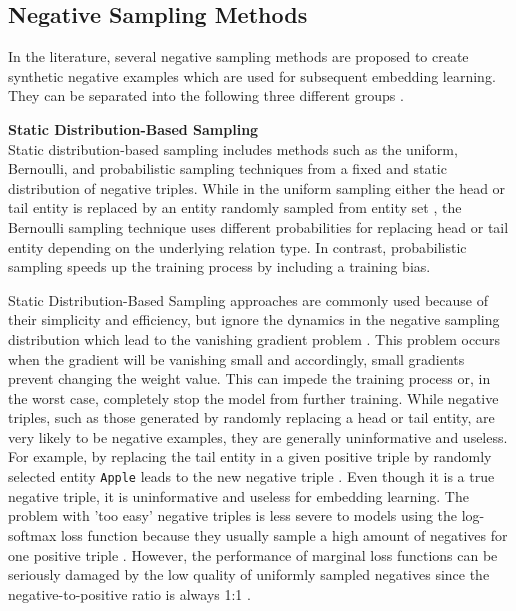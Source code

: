 \subsection{Negative Sampling Methods} 
\label{subsec:negative_sampling_methods}
%
In the literature, several negative sampling methods are proposed to create synthetic negative examples which are used for subsequent embedding learning.
They can be separated into the following three different groups \cite{qianunderstanding}.

\textbf{Static Distribution-Based Sampling} \label{static_distribution_based_sampling}\\
Static distribution-based sampling includes methods such as the uniform, Bernoulli, and probabilistic sampling techniques from a fixed and static distribution of negative triples.
While in the uniform sampling either the head or tail entity is replaced by an entity randomly sampled from entity set \entities,
the Bernoulli sampling technique uses different probabilities for replacing head or tail entity depending on the underlying relation type.
In contrast, probabilistic sampling speeds up the training process by including a training bias.
	
Static Distribution-Based Sampling approaches are commonly used because of their simplicity and efficiency, but ignore the dynamics in the negative sampling distribution which lead to the vanishing gradient problem \cite{qianunderstanding}.
This problem occurs when the gradient will be vanishing small and accordingly, small gradients prevent changing the weight value.
This can impede the training process or, in the worst case, completely stop the model from further training.
While negative triples, such as those generated by randomly replacing a head or tail entity, are very likely to be negative examples, they are generally uninformative and useless.
For example, by replacing the tail entity in a given positive triple by randomly selected entity \texttt{Apple} leads to the new negative triple .
Even though it is a true negative triple, it is uninformative and useless for embedding learning.
The problem with 'too easy' negative triples is less severe to models using the log-softmax loss function because they usually sample a high amount of negatives for one positive triple \cite{cai2017kbgan}.
However, the performance of marginal loss functions can be seriously damaged by the low quality of uniformly sampled negatives since the negative-to-positive ratio is always 1:1 \cite{cai2017kbgan}.


